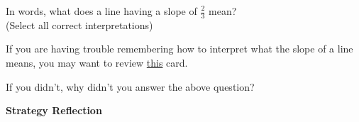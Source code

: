 \documentclass{ximera}
\begin{document}
\begin{problem} 

\begin{problem}
    In words, what does a line having a slope of $\frac{2}{3}$ mean? \\ (Select all correct interpretations)
    
    \begin{hint}
    If you are having trouble remembering how to interpret what the slope of a line means, you may want to review \href{https://ximera.osu.edu/math160fa17/m160prerequisites/PreRequisiteXards/U2CommonFunctions/2.1Polynomials/digInLinearFunctions/digInLinearFunctions}{this} card.
    \end{hint}

      \begin{selectAll}
          

      \end{selectAll}
  
\end{problem}

\begin{question}
  
  If you didn't, why didn't you answer the above question?
  
      \begin{multipleChoice}
      
  \end{multipleChoice}
  
\end{question}
  
\end{problem}


\begin{center} \textbf{Strategy Reflection}\end{center}
\end{document}
